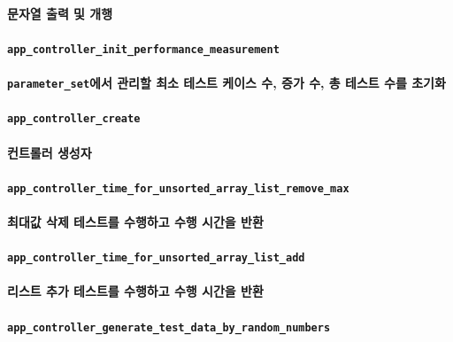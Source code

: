 \documentclass[UTF8, a4paper]{report}
\begin{document}
            \paragraph{%
                \normalfont 문자열 출력 및 개행
            }

            \paragraph{\texttt{app\_controller\_init\_performance\_measurement}}
            \paragraph{%
                \normalfont \texttt{parameter\_set}에서 관리할 최소 테스트 케이스 수, 증가 수, 총 테스트 수를 초기화
            }

            \paragraph{\texttt{app\_controller\_create}}
            \paragraph{%
                \normalfont 컨트롤러 생성자
            }

            \paragraph{\texttt{app\_controller\_time\_for\_unsorted\_array\_list\_remove\_max}}
            \paragraph{%
                \normalfont 최대값 삭제 테스트를 수행하고 수행 시간을 반환
            }
            
            \paragraph{\texttt{app\_controller\_time\_for\_unsorted\_array\_list\_add}}
            \paragraph{%
                \normalfont 리스트 추가 테스트를 수행하고 수행 시간을 반환
            }
            
            \paragraph{\texttt{app\_controller\_generate\_test\_data\_by\_random\_numbers}}
\end{document}
